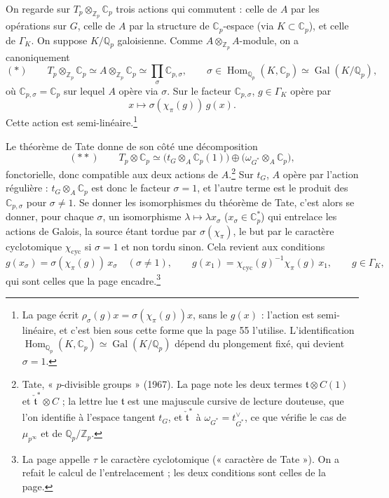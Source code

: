 \documentclass[11pt,a4paper]{article}
\begin{document}
On regarde sur $T_{p} \otimes_{\mathbb{Z}_{p}} \mathbb{C}_{p}$ trois actions
qui commutent : celle de $A$ par les opérations sur $G$, celle de $A$ par la
structure de $\mathbb{C}_{p}$-espace (via $K \subset \mathbb{C}_{p}$), et
celle de $\Gamma_{K}$. On suppose $K/\mathbb{Q}_{p}$ galoisienne. Comme
$A \otimes_{\mathbb{Z}_{p}} A$-module, on a canoniquement
\[
(*) \qquad T_{p} \otimes_{\mathbb{Z}_{p}} \mathbb{C}_{p} \simeq
A \otimes_{\mathbb{Z}_{p}} \mathbb{C}_{p} \simeq
\prod_{\sigma} \mathbb{C}_{p,\sigma},
\qquad \sigma \in \operatorname{Hom}_{\mathbb{Q}_{p}}(K, \mathbb{C}_{p})
\simeq \operatorname{Gal}(K/\mathbb{Q}_{p}),
\]
où $\mathbb{C}_{p,\sigma} = \mathbb{C}_{p}$ sur lequel $A$ opère via
$\sigma$. Sur le facteur $\mathbb{C}_{p,\sigma}$, $g \in \Gamma_{K}$ opère
par
\[
x \longmapsto \sigma(\chi_{\pi}(g))\, g(x) .
\]
Cette action est semi-linéaire.\footnote{La page écrit $\rho_{\sigma}(g)x = \sigma(\chi_{\pi}(g))x$, sans le
$g(x)$ : l'action est semi-linéaire, et c'est bien sous cette forme que la
page 55 l'utilise. L'identification
$\operatorname{Hom}_{\mathbb{Q}_{p}}(K, \mathbb{C}_{p}) \simeq
\operatorname{Gal}(K/\mathbb{Q}_{p})$ dépend du plongement fixé, qui devient
$\sigma = 1$.}

Le théorème de Tate donne de son côté une décomposition
\[
(**) \qquad T_{p} \otimes \mathbb{C}_{p} \simeq
\bigl(t_{G} \otimes_{A} \mathbb{C}_{p}(1)\bigr) \oplus
\bigl(\omega_{G^{*}} \otimes_{A} \mathbb{C}_{p}\bigr),
\]
fonctorielle, donc compatible aux deux actions de $A$.\footnote{Tate,
« $p$-divisible groups » (1967). La page note les deux termes
$\mathfrak{t} \otimes C(1)$ et $\check{\mathfrak{t}}^{*} \otimes C$ ; la lettre
lue $\mathfrak{t}$ est une majuscule cursive de lecture douteuse, que l'on
identifie à l'espace tangent $t_{G}$, et $\check{\mathfrak{t}}^{*}$ à
$\omega_{G^{*}} = t_{G^{*}}^{\vee}$, ce que vérifie le cas de
$\mu_{p^{\infty}}$ et de $\mathbb{Q}_{p}/\mathbb{Z}_{p}$.} Sur $t_{G}$, $A$
opère par l'action régulière : $t_{G} \otimes_{A} \mathbb{C}_{p}$ est donc le
facteur $\sigma = 1$, et l'autre terme est le produit des
$\mathbb{C}_{p,\sigma}$ pour $\sigma \ne 1$. Se donner les isomorphismes du
théorème de Tate, c'est alors se donner, pour chaque $\sigma$, un
isomorphisme $\lambda \mapsto \lambda x_{\sigma}$ ($x_{\sigma} \in
\mathbb{C}_{p}^{*}$) qui entrelace les actions de Galois, la source étant
tordue par $\sigma(\chi_{\pi})$, le but par le caractère cyclotomique
$\chi_{\mathrm{cyc}}$ si $\sigma = 1$ et non tordu sinon. Cela revient aux
conditions
\[
g(x_{\sigma}) = \sigma(\chi_{\pi}(g))\, x_{\sigma} \quad (\sigma \ne 1), \qquad
g(x_{1}) = \chi_{\mathrm{cyc}}(g)^{-1}\chi_{\pi}(g)\, x_{1}, \qquad
g \in \Gamma_{K} ,
\]
qui sont celles que la page encadre.\footnote{La page appelle $\tau$ le caractère cyclotomique (« caractère de
Tate »). On a refait le calcul de l'entrelacement ; les deux conditions sont
celles de la page.}
\end{document}
